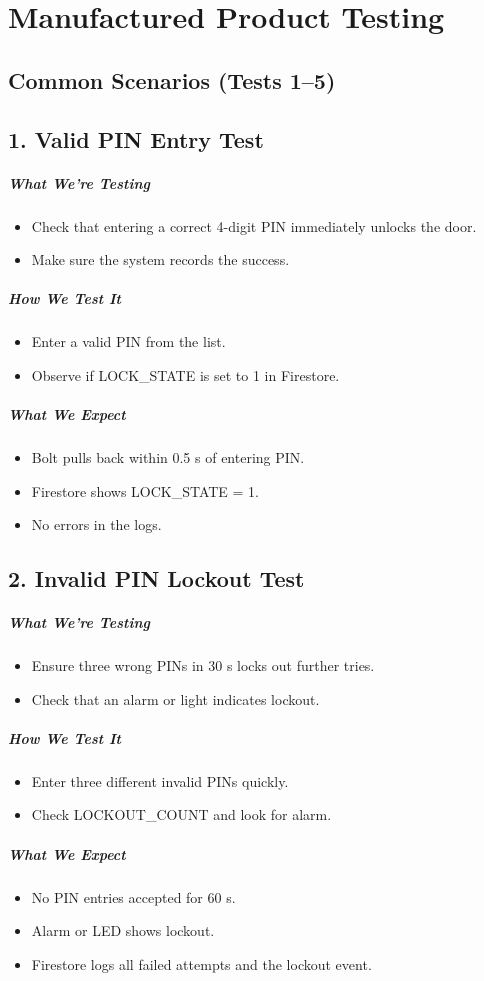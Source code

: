 \newpage
\section{Manufactured Product Testing}

\subsection*{Common Scenarios (Tests 1–5)}

\subsection*{1. Valid PIN Entry Test}
\subparagraph{What We’re Testing}
\begin{itemize}
    \item Check that entering a correct 4-digit PIN immediately unlocks the door.
    \item Make sure the system records the success.
\end{itemize}
\subparagraph{How We Test It}
\begin{itemize}
    \item Enter a valid PIN from the list.
    \item Observe if LOCK\_STATE is set to 1 in Firestore.
\end{itemize}
\subparagraph{What We Expect}
\begin{itemize}
    \item Bolt pulls back within 0.5 s of entering PIN.
    \item Firestore shows LOCK\_STATE = 1.
    \item No errors in the logs.
\end{itemize}

\subsection*{2. Invalid PIN Lockout Test}
\subparagraph{What We’re Testing}
\begin{itemize}
    \item Ensure three wrong PINs in 30 s locks out further tries.
    \item Check that an alarm or light indicates lockout.
\end{itemize}
\subparagraph{How We Test It}
\begin{itemize}
    \item Enter three different invalid PINs quickly.
    \item Check LOCKOUT\_COUNT and look for alarm.
\end{itemize}
\subparagraph{What We Expect}
\begin{itemize}
    \item No PIN entries accepted for 60 s.
    \item Alarm or LED shows lockout.
    \item Firestore logs all failed attempts and the lockout event.
\end{itemize}

